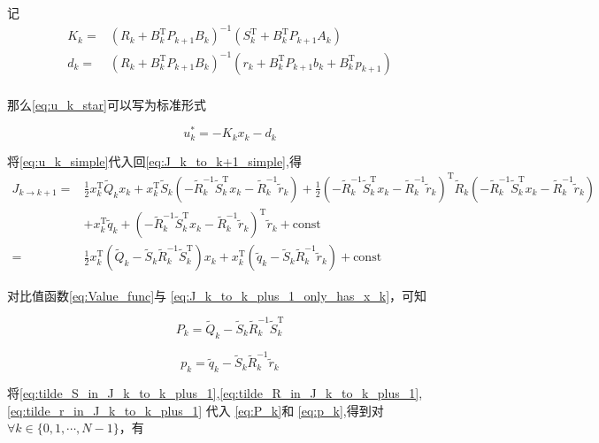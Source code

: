 \documentclass[withoutpreface,bwprint]{NoteBook}
\begin{document}
记
\begin{align}
\label{eq:K_k_define} 
{K}_k =& \left(R_k + B_k^\mathrm{T}P_{k+1}B_k \right)^{-1} \left( S_k^\mathrm{T} + B_k^\mathrm{T}P_{k+1}A_k \right) \\

\label{eq:d_k_define} 
d_k =& \left(R_k + B_k^\mathrm{T}P_{k+1}B_k \right)^{-1} \left(r_k + B_{k}^\mathrm{T}P_{k+1}b_{k} 
+ B_{k}^\mathrm{T}p_{k+1} \right) \\
\end{align}

那么\cref{eq:u_k_star}可以写为标准形式

\begin{equation}
\label{eq:u_k_normal_type}
u_k^*
= - K_k x_k 
- d_k 
\end{equation}

将\cref{eq:u_k_simple}代入回\cref{eq:J_k_to_k+1_simple},得
\begin{align}
\label{eq:J_k_to_k_plus_1_only_has_x_k}
J_{k\rightarrow k+1}
=& \frac{1}{2}x_k^\mathrm{T} \tilde{Q}_k x_k
+ x_k^\mathrm{T} \tilde{S}_k \left( - \tilde{R}_k^{-1} \tilde{S}_k^\mathrm{T} x_k 
- \tilde{R}_k^{-1} \tilde{r}_k \right)
+ \frac{1}{2} \left( - \tilde{R}_k^{-1} \tilde{S}_k^\mathrm{T} x_k 
- \tilde{R}_k^{-1} \tilde{r}_k \right)^\mathrm{T} \tilde{R}_k \left( - \tilde{R}_k^{-1} \tilde{S}_k^\mathrm{T} x_k 
- \tilde{R}_k^{-1} \tilde{r}_k \right) \nonumber \\
&+ x_k^\mathrm{T} \tilde{q}_k 
+ \left( - \tilde{R}_k^{-1} \tilde{S}_k^\mathrm{T} x_k - \tilde{R}_k^{-1} \tilde{r}_k \right)^\mathrm{T} \tilde{r}_k 
+ \text{const} \nonumber \\
=& \frac{1}{2}x_k^\mathrm{T}\left( \tilde{Q}_k - \tilde{S}_k \tilde{R}_k^{-1} \tilde{S}_k^\mathrm{T} \right) x_k 
+ x_k^\mathrm{T} \left( \tilde{q}_k - \tilde{S}_k \tilde{R}_k^{-1}\tilde{r}_k \right)
+ \text{const}
\end{align}

对比值函数\cref{eq:Value_func}与 \cref{eq:J_k_to_k_plus_1_only_has_x_k}，可知

\begin{equation}
\label{eq:P_k}
P_k = \tilde{Q}_k - \tilde{S}_k \tilde{R}_k^{-1} \tilde{S}_k^\mathrm{T}  
\end{equation}

\begin{equation}
\label{eq:p_k}
p_k =\tilde{q}_k - \tilde{S}_k \tilde{R}_k^{-1}\tilde{r}_k
\end{equation}

将\cref{eq:tilde_S_in_J_k_to_k_plus_1},\cref{eq:tilde_R_in_J_k_to_k_plus_1},\cref{eq:tilde_r_in_J_k_to_k_plus_1} 代入 \cref{eq:P_k}和 \cref{eq:p_k},得到对$\forall k \in \{ 0,1,\cdots,N-1\}$，有
\end{document}
